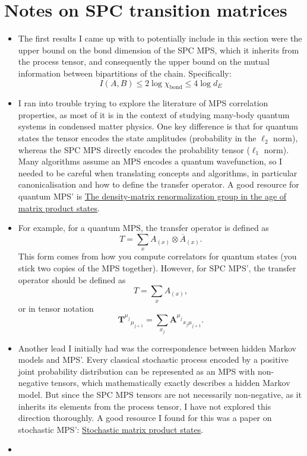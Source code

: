 \section{Notes on SPC transition matrices}
\begin{itemize}
    \item The first results I came up with to potentially include in this section were the upper bound on the bond dimension of the SPC MPS, which it inherits from the process tensor, and consequently the upper bound on the mutual information between bipartitions of the chain. Specifically:
    \[
    I(A,B) \leq 2\log \chi_{\mathrm{bond}} \leq 4\log d_E
    \]
    \item I ran into trouble trying to explore the literature of MPS correlation properties, as most of it is in the context of studying many-body quantum systems in condensed matter physics. One key difference is that for quantum states the tensor encodes the state amplitudes (probability in the \(\ell_2\) norm), whereas the SPC MPS directly encodes the probability tensor (\(\ell_1\) norm). Many algorithms assume an MPS encodes a quantum wavefunction, so I needed to be careful when translating concepts and algorithms, in particular canonicalisation and how to define the transfer operator. A good resource for quantum MPS' is \href{https://arxiv.org/abs/1008.3477}{The density-matrix renormalization group in the age of matrix product states}.
    \item For example, for a quantum MPS, the transfer operator is defined as 
    \[T = \sum_x A_{(x)} \otimes \overline{A}_{(x)}.\]
    This form comes from how you compute correlators for quantum states (you stick two copies of the MPS together). However, for SPC MPS', the transfer operator should be defined as 
    \[
    T = \sum_x A_{(x)},
    \]
    or in tensor notation
    \[\mathbf{T}^{\mu_j}{}_{\mu_{j+1}} = \sum_{x_j} \mathbf{A}^{\mu_j}{}_{x_j \mu_{j+1}}.\]
    \item Another lead I initially had was the correspondence between hidden Markov models and MPS'. Every classical stochastic process encoded by a positive joint probability distribution can be represented as an MPS with non-negative tensors, which mathematically exactly describes a hidden Markov model. But since the SPC MPS tensors are not necessarily non-negative, as it inherits its elements from the process tensor, I have not explored this direction thoroughly. A good resource I found for this was a paper on stochastic MPS': \href{https://arxiv.org/abs/1003.2545}{Stochastic matrix product states}.
    \item 
\end{itemize}

